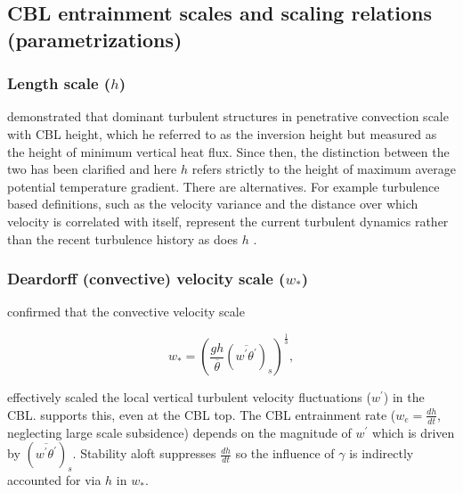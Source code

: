 \subsection{CBL entrainment scales and scaling relations (parametrizations)}
\label{subsec:scales}
\subsubsection{Length scale ($h$)}
\label{subsubsec:}

\cite{Deardorff72} demonstrated that dominant turbulent structures in penetrative convection scale with CBL height, which he referred to as the inversion height but measured as the height of minimum vertical heat flux.  Since then, the distinction between the two has been clarified \citep{SullMoengStev} and here $h$ refers strictly to the height of maximum average potential temperature gradient. There are alternatives. For example turbulence based definitions, such as the velocity variance and the distance over which velocity is correlated with itself, represent the current turbulent dynamics rather than the recent turbulence history as does $h$ \citep{Traum11}.\\

\subsubsection{Deardorff (convective) velocity scale ($w_{*}$)}
\label{subsubsec:convel}

\cite{Deardorff70} confirmed that the convective velocity scale

\begin{equation}
w_{*} = \left( \frac{gh}{\overline{\theta}}(\overline{w^{'}\theta^{'}})_{s} \right)^{\frac{1}{3}},
\end{equation}


 effectively scaled the local vertical turbulent velocity fluctuations ($w^{'}$) in the CBL.  \cite{Sorbjan1} supports this, even at the CBL top.  The CBL entrainment rate ($w_{e} = \frac{dh}{dt}$, neglecting large scale subsidence) depends on the magnitude of $w^{'}$ which is driven by $(\overline{w^{'}\theta^{'}})_{s}$. Stability aloft suppresses $\frac{dh}{dt}$ so the influence of $\gamma$ is indirectly accounted for via $h$ in $w_{*}$.\\


